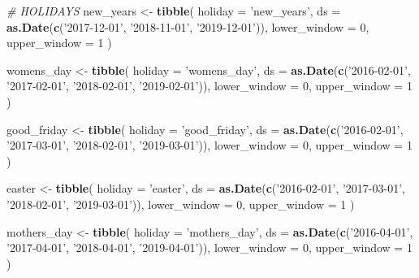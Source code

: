 \documentclass[]{article}
\newenvironment{Shaded}{\begin{snugshade}}{\end{snugshade}}
\newcommand{\KeywordTok}[1]{\textcolor[rgb]{0.13,0.29,0.53}{\textbf{{#1}}}}
\newcommand{\DataTypeTok}[1]{\textcolor[rgb]{0.13,0.29,0.53}{{#1}}}
\newcommand{\DecValTok}[1]{\textcolor[rgb]{0.00,0.00,0.81}{{#1}}}
\newcommand{\StringTok}[1]{\textcolor[rgb]{0.31,0.60,0.02}{{#1}}}
\newcommand{\CommentTok}[1]{\textcolor[rgb]{0.56,0.35,0.01}{\textit{{#1}}}}
\newcommand{\NormalTok}[1]{{#1}}
\begin{document}
\begin{Shaded}
\begin{Highlighting}[]
\CommentTok{# HOLIDAYS}
\NormalTok{new_years <-}\StringTok{ }\KeywordTok{tibble}\NormalTok{(}
  \DataTypeTok{holiday =} \StringTok{'new_years'}\NormalTok{,}
  \DataTypeTok{ds =} \KeywordTok{as.Date}\NormalTok{(}\KeywordTok{c}\NormalTok{(}\StringTok{'2017-12-01'}\NormalTok{, }\StringTok{'2018-11-01'}\NormalTok{,}
                 \StringTok{'2019-12-01'}\NormalTok{)),}
  \DataTypeTok{lower_window =} \DecValTok{0}\NormalTok{,}
  \DataTypeTok{upper_window =} \DecValTok{1}
\NormalTok{)}

\NormalTok{womens_day <-}\StringTok{ }\KeywordTok{tibble}\NormalTok{(}
  \DataTypeTok{holiday =} \StringTok{'womens_day'}\NormalTok{,}
  \DataTypeTok{ds =} \KeywordTok{as.Date}\NormalTok{(}\KeywordTok{c}\NormalTok{(}\StringTok{'2016-02-01'}\NormalTok{, }\StringTok{'2017-02-01'}\NormalTok{, }\StringTok{'2018-02-01'}\NormalTok{,}
                 \StringTok{'2019-02-01'}\NormalTok{)),}
  \DataTypeTok{lower_window =} \DecValTok{0}\NormalTok{,}
  \DataTypeTok{upper_window =} \DecValTok{1}
\NormalTok{)}

\NormalTok{good_friday <-}\StringTok{ }\KeywordTok{tibble}\NormalTok{(}
  \DataTypeTok{holiday =} \StringTok{'good_friday'}\NormalTok{,}
  \DataTypeTok{ds =} \KeywordTok{as.Date}\NormalTok{(}\KeywordTok{c}\NormalTok{(}\StringTok{'2016-02-01'}\NormalTok{, }\StringTok{'2017-03-01'}\NormalTok{, }\StringTok{'2018-02-01'}\NormalTok{,}
                 \StringTok{'2019-03-01'}\NormalTok{)),}
  \DataTypeTok{lower_window =} \DecValTok{0}\NormalTok{,}
  \DataTypeTok{upper_window =} \DecValTok{1}
\NormalTok{)}

\NormalTok{easter <-}\StringTok{ }\KeywordTok{tibble}\NormalTok{(}
  \DataTypeTok{holiday =} \StringTok{'easter'}\NormalTok{,}
  \DataTypeTok{ds =} \KeywordTok{as.Date}\NormalTok{(}\KeywordTok{c}\NormalTok{(}\StringTok{'2016-02-01'}\NormalTok{, }\StringTok{'2017-03-01'}\NormalTok{, }\StringTok{'2018-02-01'}\NormalTok{,}
                 \StringTok{'2019-03-01'}\NormalTok{)),}
  \DataTypeTok{lower_window =} \DecValTok{0}\NormalTok{,}
  \DataTypeTok{upper_window =} \DecValTok{1}
\NormalTok{)}

\NormalTok{mothers_day <-}\StringTok{ }\KeywordTok{tibble}\NormalTok{(}
  \DataTypeTok{holiday =} \StringTok{'mothers_day'}\NormalTok{,}
  \DataTypeTok{ds =} \KeywordTok{as.Date}\NormalTok{(}\KeywordTok{c}\NormalTok{(}\StringTok{'2016-04-01'}\NormalTok{, }\StringTok{'2017-04-01'}\NormalTok{, }\StringTok{'2018-04-01'}\NormalTok{,}
                 \StringTok{'2019-04-01'}\NormalTok{)),}
  \DataTypeTok{lower_window =} \DecValTok{0}\NormalTok{,}
  \DataTypeTok{upper_window =} \DecValTok{1}
\NormalTok{)}


\end{Highlighting}
\end{Shaded}
\end{document}

